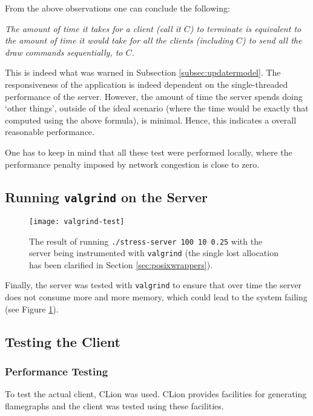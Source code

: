 \documentclass[article]{uom-coursework}
\begin{document}
From the above observations one can conclude the following:

{\em
The amount of time it takes for a client (call it $C$) to
terminate is equivalent to the amount of time it would take for
all the clients (including $C$) to send all the draw commands
sequentially, to $C$.
}

This is indeed what was warned in Subsection
\ref{subsec:updatermodel}. The responsiveness of the application
is indeed dependent on the single-threaded performance of the
server. However, the amount of time the server spends doing
`other things', outside of the ideal scenario (where the time
would be exactly that computed using the above formula), is
minimal. Hence, this indicates a overall reasonable performance.

\begin{marker}
    One has to keep in mind that all these test were performed
    locally, where the performance penalty imposed by network
    congestion is close to zero.
\end{marker}

\subsection{Running \texttt{valgrind} on the Server}

\begin{figure}[H]
\centering
\texttt{[image: valgrind-test]}
\caption{The result of running \texttt{./stress-server 100 10
0.25} with the server being instrumented with
\texttt{valgrind} (the single lost allocation has
been clarified in Section \ref{sec:posixwrappers}).}
\label{fig:valgrindservertest}
\end{figure}

Finally, the server was tested with \texttt{valgrind} to ensure
that over time the server does not consume more and more memory,
which could lead to the system failing (see Figure
\ref{fig:valgrindservertest}).

\subsection{Testing the Client}

\subsubsection{Performance Testing}

To test the actual client, CLion was used. CLion provides
facilities for generating flamegraphs and the client was tested
using these facilities.
\end{document}
